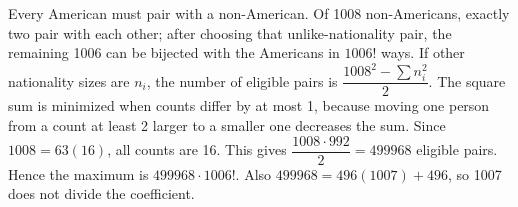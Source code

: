 Every American must pair with a non-American. Of 1008 non-Americans, exactly two pair with each other; after choosing that unlike-nationality pair, the remaining 1006 can be bijected with the Americans in $1006!$ ways. If other nationality sizes are $n_i$, the number of eligible pairs is $\dfrac{1008^2-\sum n_i^2}{2}$. The square sum is minimized when counts differ by at most 1, because moving one person from a count at least 2 larger to a smaller one decreases the sum. Since $1008=63(16)$, all counts are 16. This gives $\dfrac{1008\cdot992}{2}=499968$ eligible pairs. Hence the maximum is $\boxed{499968\cdot1006!}$. Also $499968=496(1007)+496$, so 1007 does not divide the coefficient.
